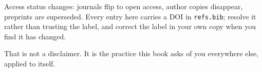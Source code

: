 \begin{conceptbox}
Access status changes: journals flip to open access, author copies disappear,
preprints are superseded. Every entry here carries a DOI in
\texttt{refs.bib}; resolve it rather than trusting the label, and correct the
label in your own copy when you find it has changed.

\medskip
That is not a disclaimer. It is the practice this book asks of you everywhere
else, applied to itself.
\end{conceptbox}
